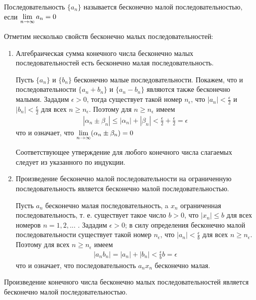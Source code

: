 \documentclass{article}
\begin{document}


Последовательность $\{a_n\}$ называется бесконечно малой последовательностью, если $\lim\limits_{n \to \infty}a_n=0$

Отметим несколько свойств бесконечно малых последовательностей:
\begin{enumerate}
	\item{}Алгебраическая сумма конечного числа бесконечно малых последовательностей есть бесконечно малая последовательность.

	Пусть $\{a_n\}$ и $\{b_n\}$ бесконечно малые последовательности. Покажем, что и последовательности $\{a_n+b_n\}$ и $\{a_n-b_n\}$ являются также бесконечно малыми.
	Зададим  $\epsilon>0$, тогда существует такой номер $n_\epsilon$, что $|a_n|<\frac{\epsilon}2$  и $|b_n|<\frac{\epsilon}2$ для всех $n \geq n_\epsilon$. Поэтому для $n \geq n_\epsilon$  имеем
	\begin{align*}
		|\alpha_n \pm \beta_n |\leq |\alpha_n|+|\beta_n|<\frac{\epsilon}2+\frac{\epsilon}2=\epsilon
	\end{align*}
	что и означает, что $\lim\limits_{n \to \infty}(\alpha_n\pm \beta_n)=0$

	Соответствующее утверждение для любого
	конечного числа слагаемых следует из указанного по индукции.
	\item{} Произведение бесконечно малой последовательности на ограниченную последовательность является бесконечно малой последовательностью.

	Пусть ${a_n}$ бесконечно малая последовательность, a ${x_n}$ ограниченная
	последовательность, т. е. существует такое число $b > 0$, что $|x_n| \leq b$ для всех номеров $n = 1, 2,...$ . Зададим  $\epsilon > 0$; в силу определения бесконечно малой последовательности существует такой номер $n_\epsilon$, что $| a_n| <\frac{\epsilon}b$ для всех $n \geq n_\epsilon$.
	Поэтому для всех $n \geq n_\epsilon$ имеем
	\begin{align*}
		|a_n b_n |= |a_n|+|b_n|<\frac{\epsilon}bb=\epsilon
	\end{align*}
	что и означает, что последовательность ${a_nx_n}$ бесконечно малая.
\end{enumerate}

\result

Произведение конечного числа бесконечно малых последовательностей является бесконечно малой последовательностью.
\end{document}
